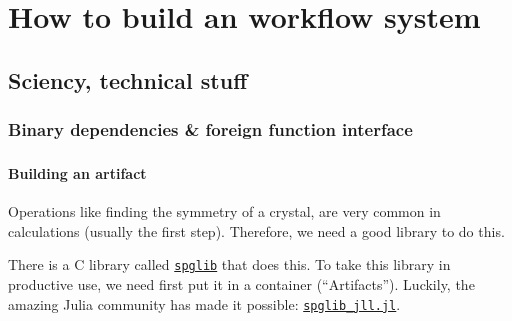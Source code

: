 \section{How to build an \ab{} workflow system}

\subsection{Sciency, technical stuff}

\subsubsection{Binary dependencies \& foreign function interface}

\begin{frame}
    \frametitle{\subsubsecname}
    \framesubtitle{Building an artifact}

    Operations like finding the symmetry of a crystal,
    are very common in \ab{} calculations (usually the first step).
    Therefore, we need a good library to do this.

    There is a C library called \href{https://github.com/spglib/spglib}{\texttt{spglib}}
    that does this.
    To take this library in productive use, we need first put it in a container
    (``Artifacts''). Luckily, the amazing Julia community has made it possible:
    \href{https://github.com/JuliaBinaryWrappers/spglib_jll.jl}{\texttt{spglib_jll.jl}}.
\end{frame}

